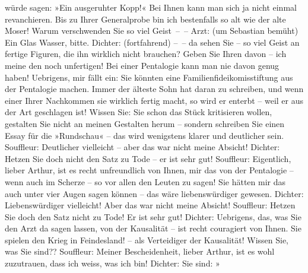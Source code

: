 \begin{ledgroupsized}[t]{13cm}
               würde sagen: »Ein ausgeruhter Kopp!« Bei Ihnen kann man sich ja nicht einmal
               revanchieren. Bis zu Ihrer Generalprobe bin ich bestenfalls so alt wie der alte
               Moser! Warum verschwenden Sie so viel Geist – –\pend
           \pstart
           Arzt: (um Sebastian bemüht) Ein Glas Wasser, bitte.\pend
           \pstart
           Dichter: (fortfahrend) – – da sehen Sie – so viel Geist an fertige Figuren, die ihn
               wirklich nicht brauchen? Geben Sie Ihren davon – ich meine den noch unfertigen! Bei
               einer Pentalogie kann man nie davon genug haben! Uebrigens, mir fällt ein: Sie
               könnten eine Familienfideikomisstiftung aus der Pentalogie machen. Immer der älteste Sohn hat daran zu schreiben, und wenn einer
               Ihrer Nachkommen sie wirklich fertig macht, so wird{ }{\pb}er enterbt – weil er aus der Art
               geschlagen ist! Wissen Sie:  Sie schon das Stück
               kritisieren wollen, gestalten Sie nicht an meinen Gestalten herum – sondern schreiben
               Sie einen Essay für die »Rundschau« – das wird
               wenigstens klarer und deutlicher sein.\pend
           \pstart
           Souffleur: Deutlicher vielleicht – aber das war nicht meine Absicht!\pend
           \pstart
           Dichter: Hetzen Sie doch nicht den Satz zu Tode – er ist sehr gut!\pend
           \pstart
           Souffleur: Eigentlich, lieber Arthur, ist es recht unfreundlich von Ihnen, mir das
               von der Pentalogie – wenn auch im Scherze – so vor allen den Leuten zu sagen! Sie
               hätten mir das auch unter vier Augen sagen können – das wäre liebenswürdiger
               gewesen.\pend
           \pstart
           Dichter: Liebenswürdiger vielleicht! Aber das war nicht meine Absicht!\pend
           \pstart
           Souffleur: Hetzen Sie doch den Satz nicht zu Tode! Er ist sehr gut!\pend
           \pstart
           Dichter: Uebrigens, das, was Sie den Arzt da sagen lassen, von der Kausalität – ist
               recht couragiert von Ihnen. Sie spielen den Krieg in Feindesland!  – als Verteidiger der Kausalität! Wissen Sie, was Sie
               sind??\pend
           \pstart
           Souffleur: Meiner Bescheiden\introOben{}heit\introOben{}, lieber Arthur, ist es wohl
               zuzutrauen, dass ich weiss, was ich bin!\pend
           \pstart
           Dichter: Sie sind: »\label{K_L01900_1v}
\end{ledgroupsized}
